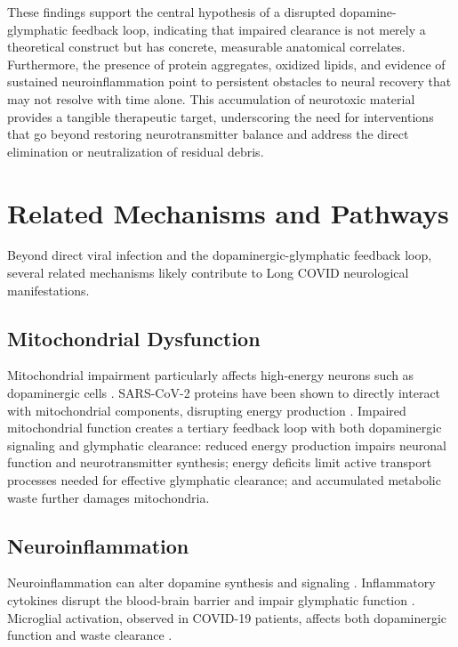 \documentclass[12pt]{article}
\begin{document}
These findings support the central hypothesis of a disrupted dopamine-glymphatic feedback loop, indicating that impaired clearance is not merely a theoretical construct but has concrete, measurable anatomical correlates. Furthermore, the presence of protein aggregates, oxidized lipids, and evidence of sustained neuroinflammation point to persistent obstacles to neural recovery that may not resolve with time alone. This accumulation of neurotoxic material provides a tangible therapeutic target, underscoring the need for interventions that go beyond restoring neurotransmitter balance and address the direct elimination or neutralization of residual debris.

\section{Related Mechanisms and Pathways}

Beyond direct viral infection and the dopaminergic-glymphatic feedback loop, several related mechanisms likely contribute to Long COVID neurological manifestations.

\subsection{Mitochondrial Dysfunction}

Mitochondrial impairment particularly affects high-energy neurons such as dopaminergic cells \citep{stefano2021mitochondria}. SARS-CoV-2 proteins have been shown to directly interact with mitochondrial components, disrupting energy production \citep{Singh2020}. Impaired mitochondrial function creates a tertiary feedback loop with both dopaminergic signaling and glymphatic clearance: reduced energy production impairs neuronal function and neurotransmitter synthesis; energy deficits limit active transport processes needed for effective glymphatic clearance; and accumulated metabolic waste further damages mitochondria.

\subsection{Neuroinflammation}

Neuroinflammation can alter dopamine synthesis and signaling \citep{crunfli2023astrocytes}. Inflammatory cytokines disrupt the blood-brain barrier and impair glymphatic function \citep{Banks2015}. Microglial activation, observed in COVID-19 patients, affects both dopaminergic function and waste clearance \citep{yang2021choroidplexus}.
\end{document}
